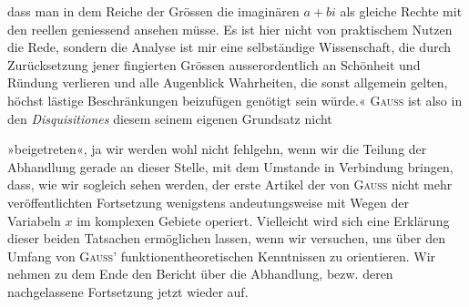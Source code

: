 dass man in dem Reiche der Grössen die imaginären \(a+bi\) als gleiche Rechte
mit den reellen geniessend ansehen müsse. Es ist hier nicht von praktischem
Nutzen die Rede, sondern die Analyse ist mir eine selbständige Wissenschaft,
die durch Zurücksetzung jener fingierten Grössen ausserordentlich an Schönheit
und Ründung verlieren und alle Augenblick Wahrheiten, die sonst allgemein
gelten, höchst lästige Beschränkungen beizufügen genötigt sein würde.«
\textsc{Gauss} ist also in den \textit{Disquisitiones} diesem seinem eigenen Grundsatz nicht\par
\HistoricalFoot{}{19\textsuperscript{*}}
\clearpage{}
\noindent »beigetreten«, ja wir werden wohl nicht fehlgehn, wenn wir die Teilung der
Abhandlung gerade an dieser Stelle, mit dem Umstande in Verbindung bringen,
dass, wie wir sogleich sehen werden, der erste Artikel der von \textsc{Gauss} nicht
mehr veröffentlichten Fortsetzung wenigstens andeutungsweise mit Wegen der
Variabeln \(x\) im komplexen Gebiete operiert. Vielleicht wird sich eine Erklärung
dieser beiden Tatsachen ermöglichen lassen, wenn wir versuchen, uns
über den Umfang von \textsc{Gauss'} funktionentheoretischen Kenntnissen zu orientieren.
Wir nehmen zu dem Ende den Bericht über die Abhandlung, bezw.
deren nachgelassene Fortsetzung jetzt wieder auf.\par

